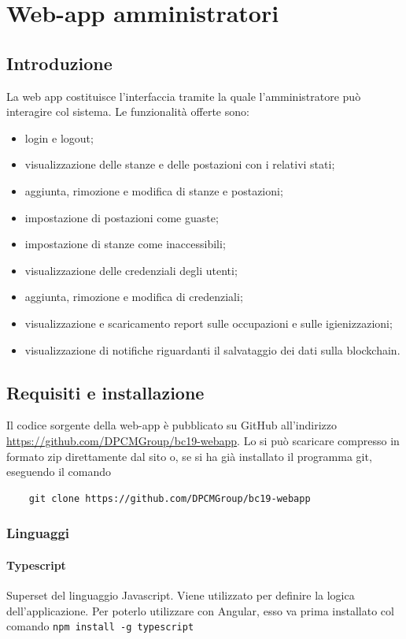 \section{Web-app amministratori}
\subsection{Introduzione}
La web app costituisce l'interfaccia tramite la quale l'amministratore può interagire col sistema.
Le funzionalità offerte sono:
\begin{itemize}
	\item login e logout;
	\item visualizzazione delle stanze e delle postazioni con i relativi stati;
	\item aggiunta, rimozione e modifica di stanze e postazioni;
	\item impostazione di postazioni come guaste;
	\item impostazione di stanze come inaccessibili;
	\item visualizzazione delle credenziali degli utenti;
	\item aggiunta, rimozione e modifica di credenziali;
	\item visualizzazione e scaricamento report sulle occupazioni e sulle igienizzazioni;
	\item visualizzazione di notifiche riguardanti il salvataggio dei dati sulla blockchain.
\end{itemize}

\subsection{Requisiti e installazione}
Il codice sorgente della web-app è pubblicato su GitHub all'indirizzo \url{https://github.com/DPCMGroup/bc19-webapp}.
Lo si può scaricare compresso in formato zip direttamente dal sito o, se si ha già installato il programma git, eseguendo il comando
\begin{verbatim}
	git clone https://github.com/DPCMGroup/bc19-webapp
\end{verbatim}

\subsubsection{Linguaggi}
\paragraph{Typescript}
Superset del linguaggio Javascript. Viene utilizzato per definire la logica dell'applicazione. \newline
Per poterlo utilizzare con Angular, esso va prima installato col comando \texttt{npm install -g typescript}

